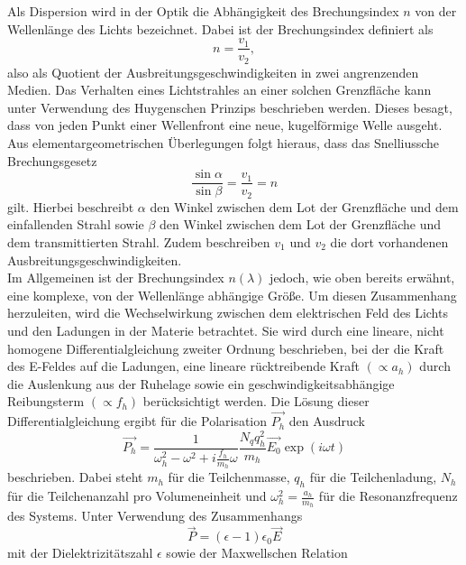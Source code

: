 Als Dispersion wird in der Optik die Abhängigkeit des Brechungsindex $n$ von der Wellenlänge des Lichts bezeichnet.
Dabei ist der Brechungsindex definiert als
\begin{equation}
  n = \frac{v_1}{v_2},
\end{equation}
also als Quotient der Ausbreitungsgeschwindigkeiten in zwei angrenzenden Medien.
Das Verhalten eines Lichtstrahles an einer solchen Grenzfläche kann unter Verwendung des Huygenschen Prinzips beschrieben werden.
Dieses besagt, dass von jeden Punkt einer Wellenfront eine neue, kugelförmige Welle ausgeht.
Aus elementargeometrischen Überlegungen folgt hieraus, dass das Snelliussche Brechungsgesetz
\begin{equation}
  \frac{\sin{\alpha}}{\sin{\beta}} = \frac{v_1}{v_2} = n
  \label{eqn:snel}
\end{equation}
gilt.
Hierbei beschreibt $\alpha$ den Winkel zwischen dem Lot der Grenzfläche und dem einfallenden Strahl sowie $\beta$ den Winkel zwischen dem Lot der Grenzfläche und dem transmittierten Strahl.
Zudem beschreiben $v_1$ und $v_2$ die dort vorhandenen Ausbreitungsgeschwindigkeiten.\\
Im Allgemeinen ist der Brechungsindex $n(\lambda)$ jedoch, wie oben bereits erwähnt, eine komplexe, von der Wellenlänge abhängige Größe.
Um diesen Zusammenhang herzuleiten, wird die Wechselwirkung zwischen dem elektrischen Feld des Lichts und den Ladungen in der Materie betrachtet.
Sie wird durch eine lineare, nicht homogene Differentialgleichung zweiter Ordnung beschrieben, bei der die Kraft des E-Feldes auf die Ladungen, eine lineare rücktreibende Kraft $( \propto a_h )$ durch die Auslenkung aus der Ruhelage sowie ein geschwindigkeitsabhängige Reibungsterm $(\propto f_h)$ berücksichtigt werden.
Die Lösung dieser Differentialgleichung ergibt für die Polarisation $\vec{P_h}$ den Ausdruck
\begin{equation}
  \vec{P_h} = \frac{1}{\omega_h^2 - \omega^2 + i \frac{f_h}{m_h}\omega} \frac{N_q q_h^2}{m_h} \vec{E_0} \exp{( i \omega t )}
\end{equation}
beschrieben.
Dabei steht $m_h$ für die Teilchenmasse, $q_h$ für die Teilchenladung, $N_h$ für die Teilchenanzahl pro Volumeneinheit und $\omega_h^2 = \frac{a_h}{m_h}$ für die Resonanzfrequenz des Systems.
Unter Verwendung des Zusammenhangs
\begin{equation}
  \vec{P} = (\epsilon - 1) \epsilon_0 \vec{E}
\end{equation}
mit der Dielektrizitätszahl $\epsilon$ sowie der Maxwellschen Relation
